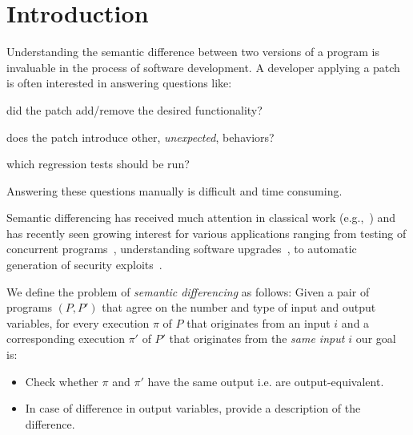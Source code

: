 \section{Introduction} 



Understanding the semantic difference between two versions of a program is invaluable in the process of software development. A developer applying a patch is often interested in answering questions like:
\begin{inparaenum}[(i)]
\item did the patch add/remove the desired functionality?
\item does the patch introduce other, \emph{unexpected}, behaviors?
\item which regression tests should be run?
\end{inparaenum}
Answering these questions manually is difficult and time consuming.

Semantic differencing has received much attention in classical work (e.g.,~\cite{Horwitz90,Horwitz89,Hoare69}) and has recently seen growing interest for various applications ranging from testing of concurrent programs~\cite{ChakiGurfinkelStrichman12}, understanding software upgrades~\cite{JinOrsoXie10}, to automatic generation of security exploits~\cite{BrumleyPoosankamSongZheng08}.

We define the problem of \emph{semantic differencing} as follows: Given a pair of programs $(P,P')$ that agree on the number and type of input and output variables, for every execution $\pi$ of $P$ that originates from an input $i$ and a corresponding execution $\pi'$ of $P'$ that originates from the \emph{same input $i$} our goal is:
\begin{itemize}
\item Check whether $\pi$ and $\pi'$ have the same output i.e. are output-equivalent.
\item In case of difference in output variables, provide a description of the difference.
\end{itemize}

